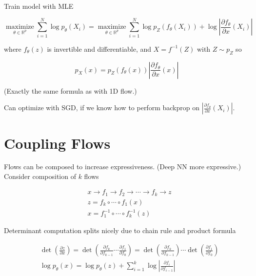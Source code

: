 \documentclass{report}
\begin{document}
\begin{definition}
    Train model with MLE

    $$
    \underset{\theta \in \mathbb{R}^{p}}{\operatorname{maximize}} \sum_{i=1}^{N} \log p_{\theta}\left(X_{i}\right)=\underset{\theta \in \mathbb{R}^{p}}{\operatorname{maximize}} \sum_{i=1}^{N} \log p_{Z}\left(f_{\theta}\left(X_{i}\right)\right)+\log \left|\frac{\partial f_{\theta}}{\partial x}\left(X_{i}\right)\right|
    $$

    where $f_{\theta}(z)$ is invertible and differentiable, and $X=f^{-1}(Z)$ with $Z \sim p_{Z}$ so

    $$
    p_{X}(x)=p_{Z}\left(f_{\theta}(x)\right)\left|\frac{\partial f_{\theta}}{\partial x}(x)\right|
    $$

    (Exactly the same formula as with 1D flow.)

    Can optimize with SGD, if we know how to perform backprop on $\left|\frac{\partial f_{\theta}}{\partial x}\left(X_{i}\right)\right|$.
\end{definition}

\section{Coupling Flows}

\begin{concept}
    Flows can be composed to increase expressiveness. (Deep NN more expressive.)
    Consider composition of $k$ flows

    $$
    \begin{aligned}
    & x \rightarrow f_{1} \rightarrow f_{2} \rightarrow \cdots \rightarrow f_{k} \rightarrow z \\
    & z=f_{k} \circ \cdots \circ f_{1}(x) \\
    & x=f_{1}^{-1} \circ \cdots \circ f_{k}^{-1}(z)
    \end{aligned}
    $$

    Determinant computation splits nicely due to chain rule and product formula

    $$
    \begin{aligned}
    & \operatorname{det}\left(\frac{\partial z}{\partial x}\right)=\operatorname{det}\left(\frac{\partial f_{k}}{\partial f_{k-1}} \cdots \frac{\partial f_{1}}{\partial f_{0}}\right)=\operatorname{det}\left(\frac{\partial f_{k}}{\partial f_{k-1}}\right) \cdots \operatorname{det}\left(\frac{\partial f_{1}}{\partial f_{0}}\right) \\
    & \log p_{\theta}(x)=\log p_{\theta}(z)+\sum_{i=1}^{k} \log \left|\frac{\partial f_{i}}{\partial f_{i-1}}\right|
    \end{aligned}
    $$
\end{concept}
\end{document}
